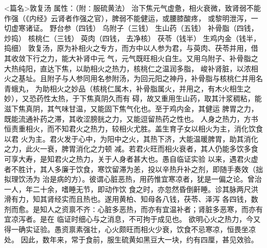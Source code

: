 \documentclass[a4paper,12pt,UTF8,twoside]{ctexbook}
\begin{document}
<篇名>敦复汤
属性：（附∶服硫黄法） 
治下焦元气虚惫，相火衰微，致肾弱不能作强（《内经》云肾者作强之官），脾弱不能健运，或腰膝酸疼， 
或黎明泄泻，一切虚寒诸证。 
野台参（四钱） 乌附子（三钱） 生山药（五钱） 补骨脂（四钱，炒捣） 核桃仁（三钱） 萸肉（四钱， 
去净核） 茯苓（钱半） 生鸡内金（钱半，捣细） 
敦复汤，原为补相火之专方，而方中以人参为君，与萸肉、茯苓并用，借其收敛下行之力，能大补肾中元 
气，元气既旺相火自生。又用乌附子、补骨脂之大热纯阳，直达下焦，以助相火之热力，核桃仁之温润多脂， 
峻补肾脏，以浓相火之基址。且附子与人参同用名参附汤，为回元阳之神丹，补骨脂与核桃仁并用名青蛾丸， 
为助相火之妙品（核桃仁属木，补骨脂属火，并用之，有木火相生之妙），又恐药性太热，于下焦真阴久而有 
碍，故又重用生山药，取其汁浆稠粘，能滋下焦真阴，其气味甘温，又能固下焦气化也。至于鸡内金，其健运 
脾胃之力，既能流通补药之滞，其收涩膀胱之力，又能逗留热药之性也。 
人身之热力，方书恒责重相火，而不知君火之热力，较相火尤胜。盖生育子女以相火为主，消化饮食以君 
火为主。君火发于心中，为阳中之火，其热下济，大能温暖脾胃，助其消化之力，此火一衰，脾胃消化之力顿 
减。若君火旺而相火衰者，其人仍能多饮多食可享大寿，是知君火之热力，关于人身者甚大也。愚自临证实验 
以来，遇君火虚者不胜计，其人多廉于饮食，寒饮留滞为恙，投以辛热升补之剂，即随手奏效（拙拟理饮汤为 
治是病的方）。彼谓心脏恶热，用药惟宜寒凉者，犹是一偏之论。曾治一人，年二十余，嗜睡无节，即动作饮 
食之时，亦忽然昏倒鼾睡。诊其脉两尺洪滑有力，知其肾经实而且热也。遂用黄柏、知母各八钱，茯苓、泽泻 
各四钱，数剂而愈。是知人之资禀不齐∶心脏多恶热，而亦有宜温补者；肾脏多恶寒，而亦有宜凉泻者。是在 
临证时细心与之消息，不可拘于成见也。 
欲明心火之热力，今又得一确实证验。愚资禀素强壮，心火颇旺而相火少衰，饮食不忌寒凉，恒畏坐凉处。 
因此，数年来，常于食前，服生硫黄如黑豆大一块，约有四厘，甚见效验。 
\end{document}
